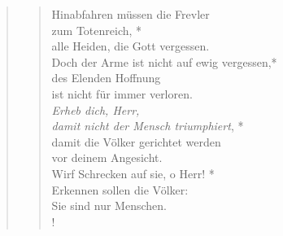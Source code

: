 \begin{quote}
\begin{verse}
Hinabfahren müssen die Frevler\\
zum Totenreich, *\\
alle Heiden, die Gott vergessen.\\
\vin Doch der Arme ist nicht auf ewig vergessen,*\\
\vin des Elenden Hoffnung\\ 
\vin ist nicht für immer verloren.\\
\textit{Erheb dich, Herr,\\
damit nicht der Mensch triumphiert}, *\\
damit die Völker gerichtet werden\\
vor deinem Angesicht.\\
\vin Wirf Schrecken auf sie, o Herr! *\\
\vin Erkennen sollen die Völker:\\ 
\vin Sie sind nur Menschen.\\!


\end{verse}

\begin{verse}

\smallskip


\end{verse}
\end{quote}
